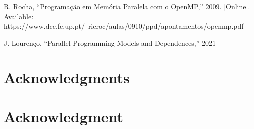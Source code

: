 \documentclass[10pt,journal,compsoc]{IEEEtran}
\begin{document}

\ifCLASSOPTIONcaptionsoff
  \newpage
\fi





%
%
%

\begin{thebibliography}{1}

R. Rocha, “Programação em Memória Paralela com o OpenMP,” 2009. [Online]. Available: https://www.dcc.fc.up.pt/~ricroc/aulas/0910/ppd/apontamentos/openmp.pdf

J. Lourenço, “Parallel Programming Models and Dependences,” 2021

\end{thebibliography}


\ifCLASSOPTIONcompsoc
  \section*{Acknowledgments}
\else
  \section*{Acknowledgment}
\fi
\end{document}
